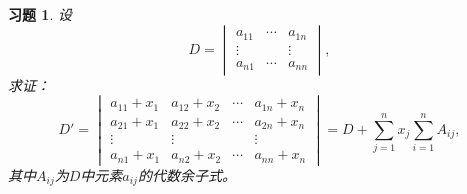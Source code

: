 \documentclass[a4paper]{book}
\newtheorem{ex}{习题}[chapter]
\begin{document}
\begin{ex} \label{ex:2.17}
设
$$D = \begin{vmatrix} a_{11} & \cdots & a_{1n} \\ \vdots & & \vdots \\ a_{n1} & \cdots & a_{nn} \end{vmatrix},$$
求证：
$$D' = \begin{vmatrix} a_{11}+x_1 & a_{12}+x_2 & \cdots & a_{1n}+x_n \\ a_{21}+x_1 & a_{22}+x_2 & \cdots & a_{2n}+x_n \\ \vdots & \vdots & & \vdots \\ a_{n1}+x_1 & a_{n2}+x_2 & \cdots & a_{nn}+x_n \end{vmatrix} = D + \sum\limits_{j=1}^n x_j \sum\limits_{i=1}^n A_{ij},$$
其中$A_{ij}$为$D$中元素$a_{ij}$的代数余子式。
\end{ex}
\end{document}
